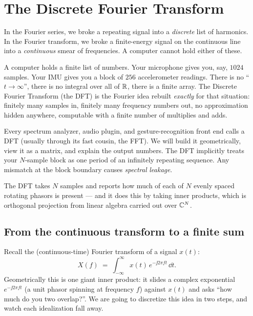\chapter{The Discrete Fourier Transform}

In the Fourier series, we broke a repeating signal into a
\emph{discrete} list of harmonics. In the Fourier transform, we broke a
finite-energy signal on the continuous line into a \emph{continuous} smear of
frequencies. A computer cannot hold either of these.

A computer holds a finite list of numbers. Your microphone gives you, say,
$1024$ samples. Your IMU gives you a block of $256$ accelerometer readings. There
is no ``$t \to \infty$'', there is no integral over all of $\mathbb{R}$, there is a
finite array. The Discrete Fourier Transform (the DFT) is the Fourier idea
rebuilt \emph{exactly} for that situation: finitely many samples in, finitely
many frequency numbers out, no approximation hidden anywhere, computable with a
finite number of multiplies and adds.

Every spectrum analyzer,
audio plugin, and gesture-recognition front end calls a DFT
(usually through its fast cousin, the FFT). We will build it geometrically, view it as a
matrix, and explain the output numbers. The DFT implicitly treats
your $N$-sample block as one period of an infinitely repeating sequence. Any mismatch
at the block boundary causes \emph{spectral leakage}.

\begin{focusbox}
The DFT takes $N$ samples and reports how much
of each of $N$ evenly spaced rotating phasors is present --- and it
does this by taking inner products, which is orthogonal projection from linear
algebra carried out over $\mathbb{C}^N$.
\end{focusbox}

\section{From the continuous transform to a finite sum}
\label{ch08:from-continuous}

Recall the (continuous-time) Fourier transform of a signal $x(t)$:
\[
X(f) \;=\; \int_{-\infty}^{\infty} x(t)\, e^{-\jj 2\pi f t}\,\dd t .
\]
Geometrically this is one giant inner product: it slides a complex exponential
$e^{-\jj 2\pi f t}$ (a unit phasor spinning at frequency $f$) against $x(t)$ and
asks ``how much do you two overlap?''. We are going to discretize this idea in
two steps, and watch each idealization fall away.

